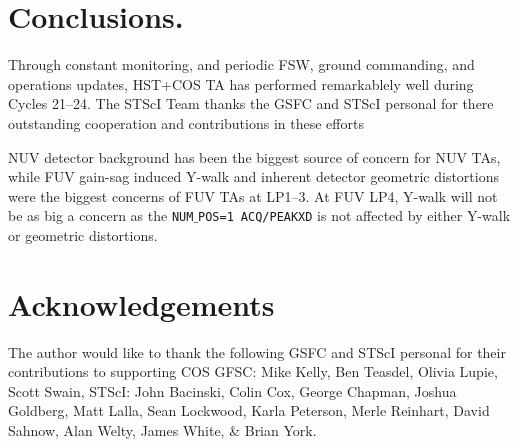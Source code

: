 \documentclass{stsci_report}
\newcommand{\numposone}{\texttt{NUM$\_$POS=1}}
\newcommand{\tacq}[1]{\texttt{ACQ/#1}}
\begin{document}
\clearpage



\clearpage

\vspace{-0.3cm}
\section{Conclusions.\label{theend} }
\vspace{-0.3cm}
Through constant monitoring, and periodic FSW, ground commanding, and operations updates,
HST+COS TA has performed remarkablely well during Cycles 21--24. The STScI Team thanks the
GSFC and STScI personal for there outstanding cooperation and contributions in these efforts

NUV detector background has been the biggest source of concern
for NUV TAs, while FUV gain-sag induced Y-walk and inherent detector geometric distortions
were the biggest concerns of FUV TAs at LP1--3. At FUV LP4, Y-walk will not be as big a concern as
the \numposone~\tacq{PEAKXD} is not affected by either Y-walk or geometric distortions.

\clearpage
\vspace{-0.3cm}
\section{Acknowledgements}
The author would like to thank the following GSFC and STScI personal for their contributions to supporting COS
GFSC: Mike Kelly, Ben Teasdel, Olivia Lupie, Scott Swain,
STScI: John Bacinski, Colin Cox, George Chapman, Joshua Goldberg, Matt Lalla, Sean Lockwood, Karla Peterson, Merle Reinhart,  David Sahnow, Alan Welty, James White, \& Brian York.
\end{document}
